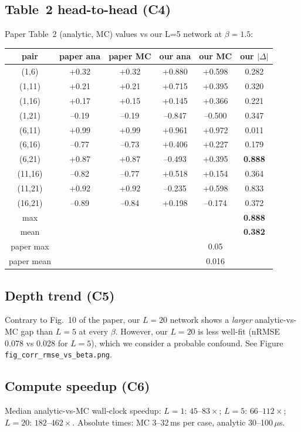 \documentclass[11pt]{article}
\begin{document}
\subsection{Table~2 head-to-head (C4)}
Paper Table~2 (analytic, MC) values vs our L{=}5 network at $\beta{=}1.5$:
\begin{center}\small
\begin{tabular}{cccccc}
\toprule
pair & paper ana & paper MC & our ana & our MC & our $|\Delta|$ \\
\midrule
(1,6)   & +0.32 & +0.32 & +0.880 & +0.598 & 0.282 \\
(1,11)  & +0.21 & +0.21 & +0.715 & +0.395 & 0.320 \\
(1,16)  & +0.17 & +0.15 & +0.145 & +0.366 & 0.221 \\
(1,21)  & --0.19 & --0.19 & --0.847 & --0.500 & 0.347 \\
(6,11)  & +0.99 & +0.99 & +0.961 & +0.972 & 0.011 \\
(6,16)  & --0.77 & --0.73 & +0.406 & +0.227 & 0.179 \\
(6,21)  & +0.87 & +0.87 & --0.493 & +0.395 & \textbf{0.888} \\
(11,16) & --0.82 & --0.77 & +0.518 & +0.154 & 0.364 \\
(11,21) & +0.92 & +0.92 & --0.235 & +0.598 & 0.833 \\
(16,21) & --0.89 & --0.84 & +0.198 & --0.174 & 0.372 \\
\midrule
max & & & & & \textbf{0.888} \\
mean & & & & & \textbf{0.382} \\
paper max & & & & 0.05 & \\
paper mean & & & & 0.016 & \\
\bottomrule
\end{tabular}
\end{center}

\subsection{Depth trend (C5)}
Contrary to Fig.~10 of the paper, our $L{=}20$ network shows a \emph{larger} analytic-vs-MC gap than $L{=}5$ at every $\beta$. However, our $L{=}20$ is less well-fit (nRMSE 0.078 vs 0.028 for $L{=}5$), which we consider a probable confound. See Figure \texttt{fig\_corr\_rmse\_vs\_beta.png}.

\subsection{Compute speedup (C6)}
Median analytic-vs-MC wall-clock speedup: $L{=}1$: $45$--$83\times$; $L{=}5$: $66$--$112\times$; $L{=}20$: $182$--$462\times$. Absolute times: MC 3--32\,ms per case, analytic 30--100\,$\mu$s.
\end{document}
